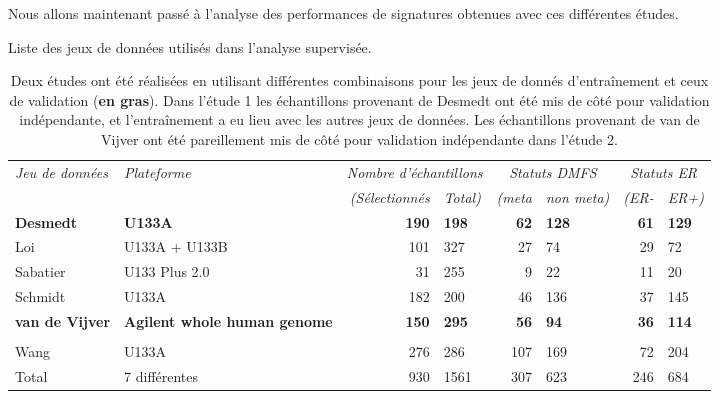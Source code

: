 		Nous allons maintenant passé à l'analyse des performances de signatures obtenues avec ces différentes études.

		\begin{table}
				\begin{center}
					\caption{Liste des jeux de données utilisés dans l'analyse supervisée.}
					\begin{tabular}{llr@{/}lr@{/}lr@{/}l}
						\toprule
						\emph{Jeu de données} & \emph{Plateforme} & \multicolumn{2}{c}{\emph{Nombre d'échantillons}} & \multicolumn{2}{c}{\emph{Statuts DMFS}} & \multicolumn{2}{c}{\emph{Statuts ER}} \\
						\cmidrule(r){3-8}
						&  & \emph{(Sélectionnés} & \emph{Total)}           & \emph{(meta} & \emph{non meta)} & \emph{(ER-}     & \emph{ER+)} \\
						\midrule
						\textbf{Desmedt}          & \textbf{U133A}          & \textbf{190} & \textbf{198} & \textbf{62} & \textbf{128} & \textbf{61} & \textbf{129} \\
						Loi                       & U133A + U133B           & 101 & 327                   & 27 & 74                & 29 & 72            \\
						Sabatier                  & U133 Plus 2.0           & 31 & 255                    & 9 & 22                 & 11 & 20            \\
						Schmidt                   & U133A                   & 182 & 200                   & 46 & 136               & 37 & 145           \\
						\textbf{van de Vijver}    & \multirow{2}{2.49cm}{\textbf{Agilent whole human genome}}  & \textbf{150} & \textbf{295} & \textbf{56} & \textbf{94}  & \textbf{36} & \textbf{114} \\
						& \\
						Wang                      & U133A                   & 276 & 286                   & 107 & 169              & 72 & 204           \\
						\midrule
						Total                     & 7 différentes           & 930 & 1561                  & 307 & 623              & 246 & 684          \\
						\bottomrule
					\end{tabular}\label{tab:Res2Data}
					\vspace{5ex}
					\caption*{Deux études ont été réalisées en utilisant différentes combinaisons pour les jeux de donnés d'entraînement et ceux de validation (\textbf{en gras}). Dans l'étude 1 les échantillons provenant de Desmedt ont été mis de côté pour validation indépendante, et l'entraînement a eu lieu avec les autres jeux de données. Les échantillons provenant de van de Vijver ont été pareillement mis de côté pour validation indépendante dans l'étude 2.}
				\end{center}
			\end{table}
